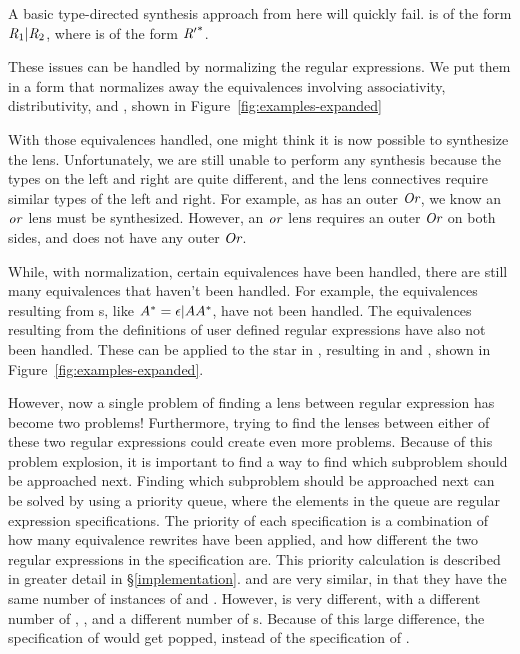 \documentclass[numbers,10pt,preprint\ifanon ,nocopyrightspace\fi]{sigplanconf}
\begin{document}
A basic type-directed synthesis approach from here will quickly fail.
 is of the form $\mathit{R}_1|\mathit{R}_2$, where  is of the form
${\mathit{R}'}^*$.

These issues can be handled by normalizing the regular expressions.
We put them in a form that normalizes away the equivalences involving
associativity, distributivity, and \EmptyString{}, shown in
Figure~\ref{fig:examples-expanded}

With those equivalences handled, one might think it is now possible to
synthesize the lens.
Unfortunately, we are still unable to perform any synthesis because the types
on the left and right are quite different, and the lens connectives require
similar types of the left and right.
For example, as  has an outer $\textit{Or}$, we know an $\mathit{or}$ lens must be
synthesized.
However, an $\mathit{or}$ lens requires an outer $\textit{Or}$ on both sides, and  does
not have any outer $\textit{Or}$.

While, with normalization, certain equivalences have been handled, there are
still many equivalences that haven't been handled.
For example, the equivalences resulting from \StarRegexType{}s, like
${A}^*=\epsilon | A{A}^*$, have not been handled.
The equivalences resulting from the definitions of user defined regular
expressions have also not been handled. These can be applied to the star in
, resulting in  and , shown in
Figure~\ref{fig:examples-expanded}.

However, now a single problem of finding a lens between regular expression has
become two problems!  Furthermore, trying to find the lenses between either of these
two regular expressions could create even more problems.  Because of this
problem explosion, it is
important to find a way to find which subproblem should be approached next.
Finding which subproblem should be approached next can be solved by using a
priority queue, where the
elements in the queue are regular expression specifications.  The priority of
each specification is a combination of how many equivalence rewrites have been
applied,
and how different the two regular expressions in the specification are.  This
priority calculation is described in greater detail in
\S\ref{implementation}.
 and  are very similar, in that they have the same
number of instances of  and .  However,  is
very different, with a different number of , , and a
different number of \StarRegexType{}s.  Because of this large difference, the
specification of  would get popped, instead of the
specification of .
\end{document}
